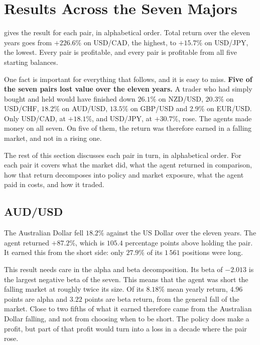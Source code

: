 \section{Results Across the Seven Majors}
\label{Section:PairResults}

 gives the result for each pair, in alphabetical order. Total return over the eleven years goes from $+226.6\%$ on USD/CAD, the highest, to $+15.7\%$ on USD/JPY, the lowest. Every pair is profitable, and every pair is profitable from all five starting balances.



One fact is important for everything that follows, and it is easy to miss. \textbf{Five of the seven pairs lost value over the eleven years.} A trader who had simply bought and held would have finished down $26.1\%$ on NZD/USD, $20.3\%$ on USD/CHF, $18.2\%$ on AUD/USD, $13.5\%$ on GBP/USD and $2.9\%$ on EUR/USD. Only USD/CAD, at $+18.1\%$, and USD/JPY, at $+30.7\%$, rose. The agents made money on all seven. On five of them, the return was therefore earned in a falling market, and not in a rising one.



The rest of this section discusses each pair in turn, in alphabetical order. For each pair it covers what the market did, what the agent returned in comparison, how that return decomposes into policy and market exposure, what the agent paid in costs, and how it traded.

\subsection{AUD/USD}

The Australian Dollar fell $18.2\%$ against the US Dollar over the eleven years. The agent returned $+87.2\%$, which is $105.4$ percentage points above holding the pair. It earned this from the short side: only $27.9\%$ of its $1\,561$ positions were long.

This result needs care in the alpha and beta decomposition. Its beta of $-2.013$ is the largest negative beta of the seven. This means that the agent was short the falling market at roughly twice its size. Of its $8.18\%$ mean yearly return, $4.96$ points are alpha and $3.22$ points are beta return, from the general fall of the market. Close to two fifths of what it earned therefore came from the Australian Dollar falling, and not from choosing when to be short. The policy does make a profit, but part of that profit would turn into a loss in a decade where the pair rose.

